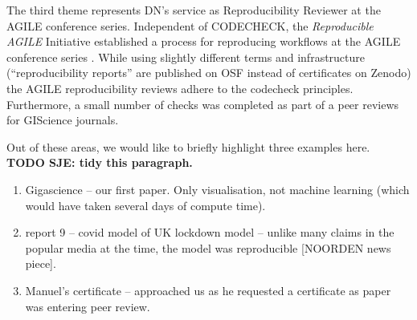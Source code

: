 \documentclass[12pt]{article}
\begin{document}
The third theme represents DN's service as Reproducibility
Reviewer at the AGILE conference series.
Independent of CODECHECK, the \emph{Reproducible AGILE} Initiative \cite{reproducible_agile}
established a process for reproducing workflows at the AGILE conference
series \cite{nust_improving_2020}.
While using slightly different terms and infrastructure (``reproducibility
reports'' are published on OSF instead of certificates on Zenodo) the 
AGILE reproducibility reviews adhere to the codecheck principles.
Furthermore, a small number of checks was completed as part of a peer reviews
for GIScience journals.

Out of these areas, we would like to briefly highlight three examples here.
\textbf{TODO SJE: tidy this paragraph.}
\begin{enumerate}
\def\labelenumi{\arabic{enumi}.}
\item
  Gigascience -- our first paper.  Only visualisation, not machine
  learning (which would have taken several days of compute time).
\item
  report 9 -- covid model of UK lockdown model -- unlike many claims
  in the popular media at the time, the model was reproducible
  [NOORDEN news piece]. 
\item
  Manuel's certificate -- approached us as he requested a certificate
  as paper was entering peer review.
\end{enumerate}
\end{document}
